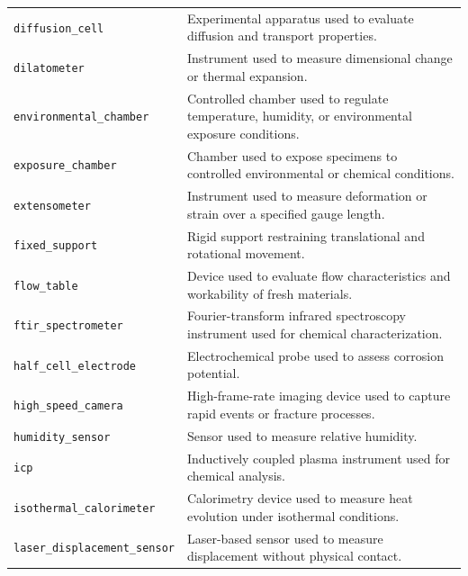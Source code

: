\documentclass[11pt]{book}
\begin{document}
{\begin{longtable}{p{}p{}}
\texttt{diffusion\_cell} &
Experimental apparatus used to evaluate diffusion and transport properties. \\

\texttt{dilatometer} &
Instrument used to measure dimensional change or thermal expansion. \\

\texttt{environmental\_chamber} &
Controlled chamber used to regulate temperature, humidity, or environmental exposure conditions. \\

\texttt{exposure\_chamber} &
Chamber used to expose specimens to controlled environmental or chemical conditions. \\

\texttt{extensometer} &
Instrument used to measure deformation or strain over a specified gauge length. \\

\texttt{fixed\_support} &
Rigid support restraining translational and rotational movement. \\

\texttt{flow\_table} &
Device used to evaluate flow characteristics and workability of fresh materials. \\

\texttt{ftir\_spectrometer} &
Fourier-transform infrared spectroscopy instrument used for chemical characterization. \\

\texttt{half\_cell\_electrode} &
Electrochemical probe used to assess corrosion potential. \\

\texttt{high\_speed\_camera} &
High-frame-rate imaging device used to capture rapid events or fracture processes. \\

\texttt{humidity\_sensor} &
Sensor used to measure relative humidity. \\

\texttt{icp} &
Inductively coupled plasma instrument used for chemical analysis. \\

\texttt{isothermal\_calorimeter} &
Calorimetry device used to measure heat evolution under isothermal conditions. \\

\texttt{laser\_displacement\_sensor} &
Laser-based sensor used to measure displacement without physical contact. \\


\end{longtable}}
\end{document}
